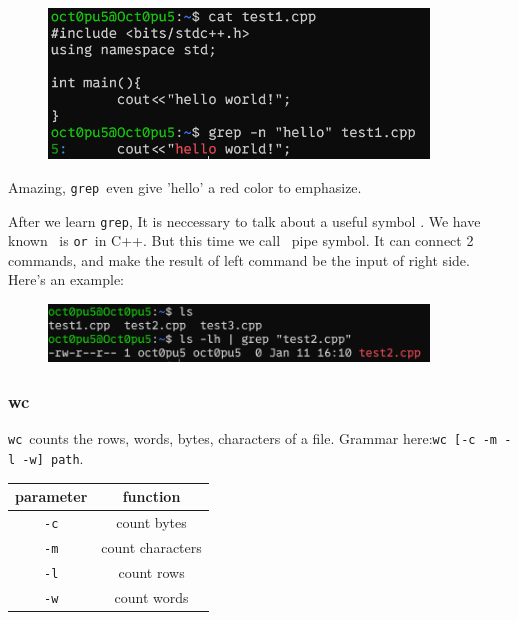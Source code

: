 \documentclass[12pt]{ctexart}
\begin{document}
\begin{figure}[H]
    \centering
    \includegraphics[width=0.9\textwidth,keepaspectratio]{assets/Linux/1.5 Linux file commands/10.png}
\end{figure}

Amazing, \texttt{grep}\ even give 'hello' a red color to emphasize.

After we learn \texttt{grep}, It is neccessary to talk about a useful
symbol \texttt{\textbar{}}. We have known \texttt{\textbar{}\textbar{}}\
is \texttt{or}\ in C++. But this time we call \texttt{\textbar{}}\ pipe
symbol. It can connect 2 commands, and make the result of left command
be the input of right side. Here's an example:

\begin{figure}[H]
    \centering
    \includegraphics[width=0.9\textwidth,keepaspectratio]{assets/Linux/1.5 Linux file commands/11.png}
\end{figure}
\subsubsection{\textbf{wc}}

\texttt{wc}\ counts the rows, words, bytes, characters of a file. Grammar
here:\texttt{wc\ {[}-c\ -m\ -l\ -w{]}\ path}.

\begin{table}[H]
    \centering
    \begin{tabular}{cc}
    \toprule
    parameter & function \\
    \midrule
    \texttt{-c} & count bytes \\
    \texttt{-m} & count characters \\
    \texttt{-l} & count rows \\
    \texttt{-w} & count words \\
    \bottomrule
    \end{tabular}
\end{table}
\end{document}
